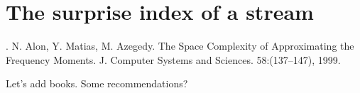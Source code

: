 \documentclass[12pt]{article}
\begin{document}
\section{The surprise index of a stream}



\begin{thebibliography}{XXX}

 . N. Alon, Y. Matias, M. Azegedy. The Space Complexity of Approximating the Frequency Moments. J. Computer Systems and Sciences. 58:(137--147), 1999.

Let's add books. Some recommendations?

\end{thebibliography}
\end{document}
